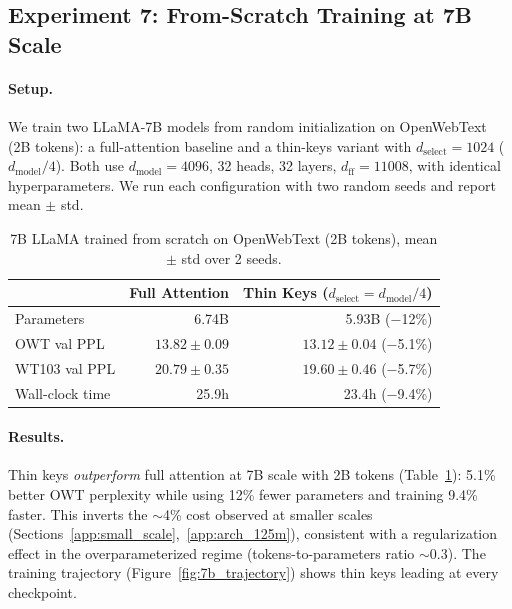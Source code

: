 \documentclass[11pt]{article}
\newcommand{\dmodel}{d_{\text{model}}}
\newcommand{\dselect}{d_{\text{select}}}
\begin{document}
\subsection{Experiment 7: From-Scratch Training at 7B Scale}

\paragraph{Setup.}
We train two LLaMA-7B models from random initialization on OpenWebText (2B tokens): a full-attention baseline and a thin-keys variant with $\dselect = 1024$ ($\dmodel/4$). Both use $\dmodel = 4096$, 32 heads, 32 layers, $d_{\text{ff}} = 11008$, with identical hyperparameters. We run each configuration with two random seeds and report mean $\pm$ std.

\begin{table}[h]
\centering
\caption{7B LLaMA trained from scratch on OpenWebText (2B tokens), mean $\pm$ std over 2 seeds.}
\label{tab:7b_scratch}
\begin{tabular}{lrr}
\toprule
 & Full Attention & Thin Keys ($\dselect = \dmodel/4$) \\
\midrule
Parameters & 6.74B & 5.93B ($-$12\%) \\
OWT val PPL & $13.82 \pm 0.09$ & $\mathbf{13.12 \pm 0.04}$ ($-$5.1\%) \\
WT103 val PPL & $20.79 \pm 0.35$ & $\mathbf{19.60 \pm 0.46}$ ($-$5.7\%) \\
Wall-clock time & 25.9h & 23.4h ($-$9.4\%) \\
\bottomrule
\end{tabular}
\end{table}

\paragraph{Results.}
Thin keys \emph{outperform} full attention at 7B scale with 2B tokens (Table~\ref{tab:7b_scratch}): 5.1\% better OWT perplexity while using 12\% fewer parameters and training 9.4\% faster. This inverts the $\sim$4\% cost observed at smaller scales (Sections~\ref{app:small_scale},~\ref{app:arch_125m}), consistent with a regularization effect in the overparameterized regime (tokens-to-parameters ratio $\sim$0.3). The training trajectory (Figure~\ref{fig:7b_trajectory}) shows thin keys leading at every checkpoint.
\end{document}
